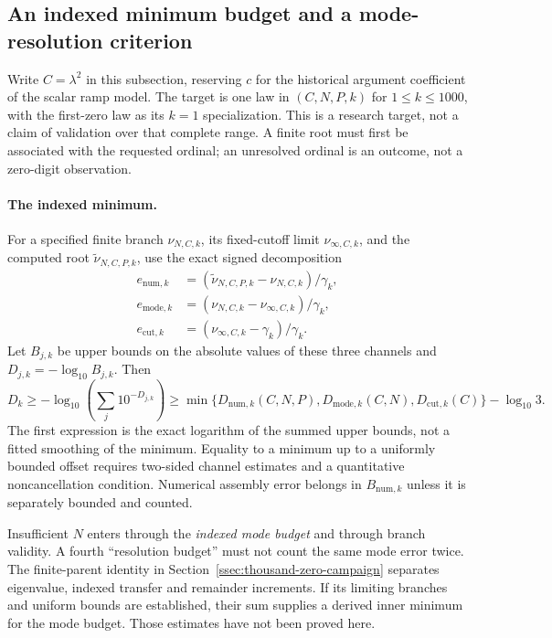 \subsection{An indexed minimum budget and a mode-resolution criterion}
\label{ssec:indexed-resolution-budget}

Write $C=\lambda^2$ in this subsection, reserving $c$ for the historical
argument coefficient of the scalar ramp model. The target is one law in
$(C,N,P,k)$ for $1\le k\le1000$, with the first-zero law as its $k=1$
specialization. This is a research target, not a claim of validation over
that complete range. A finite root must first be associated with the
requested ordinal; an unresolved ordinal is an outcome, not a zero-digit
observation.

\paragraph{The indexed minimum.}
For a specified finite branch $\nu_{N,C,k}$, its fixed-cutoff limit
$\nu_{\infty,C,k}$, and the computed root $\widetilde\nu_{N,C,P,k}$, use
the exact signed decomposition
\begin{align}
 e_{\mathrm{num},k}&=(\widetilde\nu_{N,C,P,k}-\nu_{N,C,k})/\gamma_k,\nonumber\\
 e_{\mathrm{mode},k}&=(\nu_{N,C,k}-\nu_{\infty,C,k})/\gamma_k,\nonumber\\
 e_{\mathrm{cut},k}&=(\nu_{\infty,C,k}-\gamma_k)/\gamma_k.
 \label{eq:indexed-signed-channels}
\end{align}
Let $B_{j,k}$ be upper bounds on the absolute values of these three
channels and $D_{j,k}=-\log_{10}B_{j,k}$. Then
\begin{equation}\label{eq:indexed-min-budget}
 D_k\ge-\log_{10}\!\left(\sum_j10^{-D_{j,k}}\right)
 \ge\min\{D_{\mathrm{num},k}(C,N,P),D_{\mathrm{mode},k}(C,N),
                   D_{\mathrm{cut},k}(C)\}-\log_{10}3.
\end{equation}
The first expression is the exact logarithm of the summed upper bounds,
not a fitted smoothing of the minimum. Equality to a minimum up to a
uniformly bounded offset requires two-sided channel estimates and a
quantitative noncancellation condition. Numerical assembly error belongs
in $B_{\mathrm{num},k}$ unless it is separately bounded and counted.

Insufficient $N$ enters through the \emph{indexed mode budget} and through
branch validity. A fourth ``resolution budget'' must not count the same
mode error twice. The finite-parent identity in
Section~\ref{ssec:thousand-zero-campaign} separates eigenvalue, indexed
transfer and remainder increments. If its limiting branches and uniform
bounds are established, their sum supplies a derived inner minimum for
the mode budget. Those estimates have not been proved here.

